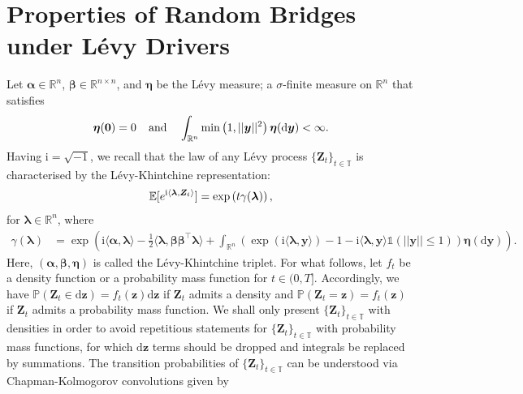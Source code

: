 \documentclass{article}
\newcommand{\levy}{{L\'evy }}
\def\1{\mathds{1}}
\def\R{\mathbb{R}}
\def\P{\mathbb{P}}
\def\E{\mathbb{E}}
\def\T{\mathbb{T}}
\def\dd{\mathrm{d}}
\def\tp{\top}
\theoremstyle{definition}
\begin{document}
\appendix
\section{Properties of Random Bridges under \levy Drivers}\label{app:resultsongeneralisedlevy}
Let $\boldsymbol{\alpha}\in\R^n$, $\boldsymbol{\beta} \in \R^{n\times n}$, and $\boldsymbol{\eta}$ be the \levy measure; a $\sigma$-finite measure on $\R^{n}$ that satisfies
\begin{align}
\boldsymbol{\eta}(\boldsymbol{0}) = 0 \hspace{0.15in} \text{and} \hspace{0.15in} \int_{\R^n} \min\left(1, ||\boldsymbol{y}||^2 \right)\boldsymbol{\eta}(\dd \boldsymbol{y} ) < \infty. \notag
\end{align}
Having $\text{i} = \sqrt{-1}$, we recall that the law of any \levy process $\{\boldsymbol{Z}_t\}_{t\in\T}$ is characterised by the L\'evy-Khintchine representation:
\begin{align}
\E[e^{\text{i} \langle\boldsymbol{\lambda} , \boldsymbol{Z}_t\rangle}] = \exp\left( t \gamma(\boldsymbol{\lambda}) \right), \notag
\end{align}
for $\boldsymbol{\lambda}\in\R^n$, where
\begin{align}
\label{levykhinctine}
\gamma(\boldsymbol{\lambda}) &= \exp\left(\text{i}\langle\boldsymbol{\alpha} , \boldsymbol{\lambda}\rangle -\frac{1}{2}\langle \boldsymbol{\lambda} , \boldsymbol{\beta} \boldsymbol{\beta}^{\tp} \boldsymbol{\lambda} \rangle + \int_{\R^n}\left(\exp(\text{i} \langle \boldsymbol{\lambda} , \boldsymbol{y} \rangle)- 1 - \text{i}\langle \boldsymbol{\lambda} , \boldsymbol{y} \rangle\1(||\boldsymbol{y}|| \leq 1)\right)\boldsymbol{\eta}(\dd \boldsymbol{y})\right).
\end{align}
Here, $(\boldsymbol{\alpha}, \boldsymbol{\beta}, \boldsymbol{\eta})$ is called the L\'evy-Khintchine triplet. For what follows, let $f_t$ be a density function or a probability mass function for $t\in(0,T]$. Accordingly, we have $\P(\mathbf{Z}_t \in \dd \boldsymbol{z}) = f_t(\boldsymbol{z})\dd \boldsymbol{z}$ if $\mathbf{Z}_t$ admits a density and $\P(\mathbf{Z}_t = \boldsymbol{z}) = f_t(\boldsymbol{z})$ if $\mathbf{Z}_t$ admits a probability mass function. We shall only present $\{\mathbf{Z}_t\}_{t\in\T}$ with densities in order to avoid repetitious statements for $\{\mathbf{Z}_t\}_{t\in\T}$ with probability mass functions, for which $\dd \boldsymbol{z}$ terms should be dropped and integrals be replaced by summations. The transition probabilities of $\{\mathbf{Z}_t\}_{t\in\T}$ can be understood via Chapman-Kolmogorov convolutions given by
\end{document}
